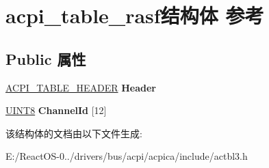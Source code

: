 \hypertarget{structacpi__table__rasf}{}\section{acpi\+\_\+table\+\_\+rasf结构体 参考}
\label{structacpi__table__rasf}
\subsection*{Public 属性}
\begin{DoxyCompactItemize}
\item 
\mbox{\label{structacpi__table__rasf_a5608ed30744d72d7cf954a689f3d2799}} 
\hyperlink{structacpi__table__header}{A\+C\+P\+I\+\_\+\+T\+A\+B\+L\+E\+\_\+\+H\+E\+A\+D\+ER} {\bfseries Header}
\item 
\mbox{\label{structacpi__table__rasf_ab54a82515e6145272027105340542e65}} 
\hyperlink{_processor_bind_8h_ab27e9918b538ce9d8ca692479b375b6a}{U\+I\+N\+T8} {\bfseries Channel\+Id} \mbox{[}12\mbox{]}
\end{DoxyCompactItemize}


该结构体的文档由以下文件生成\+:\begin{DoxyCompactItemize}
\item 
E\+:/\+React\+O\+S-\/0../drivers/bus/acpi/acpica/include/actbl3.\+h\end{DoxyCompactItemize}
